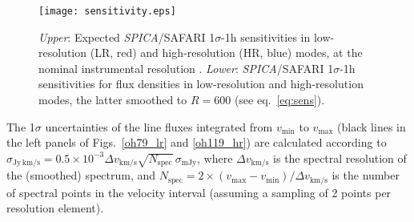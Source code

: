 \documentclass{pasa}%
\begin{document}
\begin{appendix}
\begin{figure}
\begin{center}
\texttt{[image: sensitivity.eps]}
\caption{{\it Upper}: Expected {\it SPICA}/SAFARI 1$\sigma$-1h 
  sensitivities in low-resolution (LR, red) and high-resolution (HR, blue)
  modes, at the nominal instrumental resolution \citep{spi17,roe17}. 
  {\it Lower}: {\it SPICA}/SAFARI
  1$\sigma$-1h sensitivities for flux densities in low-resolution and
  high-resolution modes, the latter smoothed to $R=600$ (see
  eq.~\ref{eq:sens}).  
} 
\label{sensit}
\end{center}
\end{figure}

The 1$\sigma$ uncertainties of the line fluxes integrated from
$v_{\mathrm{min}}$ to $v_{\mathrm{max}}$ (black lines in the left panels of
Figs.~\ref{oh79_lr} and \ref{oh119_hr}) are calculated according to
$\sigma_{\mathrm{Jy\,km/s}}=0.5\times 10^{-3} \Delta v_{\mathrm{km/s}}
\sqrt{N_{\mathrm{spec}}}\, \sigma_{\mathrm{mJy}}$, where 
$\Delta v_{\mathrm{km/s}}$ is the spectral resolution of the (smoothed) 
spectrum, and $N_{\mathrm{spec}}=2\times(v_{\mathrm{max}}-v_{\mathrm{min}})/\Delta
v_{\mathrm{km/s}}$ is the number of spectral points in the velocity interval
(assuming a sampling of 2 points per resolution element). 





\end{appendix}



%
\end{document}
